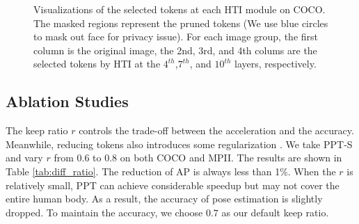 \documentclass[runningheads]{llncs}
\begin{document}
\begin{figure}[t]
\small 
    \centering
             \caption{
    \small{Visualizations of the selected tokens at each HTI module on COCO. The masked regions represent the pruned tokens (We use blue circles to mask out face for privacy issue). For each image group, the first column is the original image, the 2nd, 3rd, and 4th colums are the selected tokens by HTI at the $4^{th}$,$7^{th}$, and $10^{th}$ layers, respectively.  }
    }
    \label{fig:human_mask}
\end{figure}


\vspace{-0.5em}
\subsection{Ablation Studies}
\vspace{-0.5em}

The keep ratio $r$ controls the trade-off between the acceleration and the accuracy. Meanwhile, reducing tokens also introduces some regularization \cite{zhu2020deformable}. 
We take PPT-S and vary $r$ from $0.6$ to $0.8$ on both COCO and MPII. The results are shown in Table \ref{tab:diff_ratio}. The reduction of AP is always less than 1\%. 
When the $r$ is relatively small, PPT can achieve considerable speedup but may not cover the entire human body. As a result, the accuracy of pose estimation is slightly dropped.  
To maintain the accuracy, we choose $0.7$ as our default keep ratio. 
\end{document}
